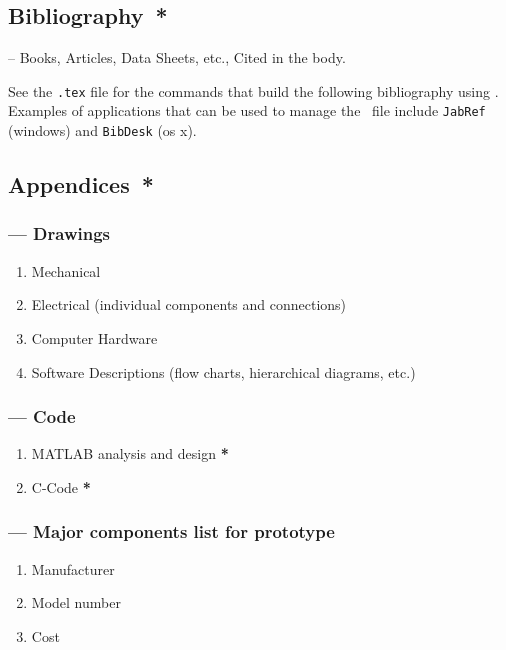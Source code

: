 \documentclass[twocolumn]{article}
\begin{document}
\subsection*{Bibliography{\color{red}\ *}}
-- Books, Articles, Data Sheets, etc., Cited in the body. 

See the \verb|.tex| file for the commands that build the following bibliography using \BibTeX. Examples of applications that can be used to manage the \BibTeX\  file include \verb|JabRef| (windows) and \verb|BibDesk| (os x).

\subsection*{Appendices{\color{red}\ *}}
\subsubsection*{ --- Drawings}
\begin{enumerate}
\item{Mechanical}
\item{Electrical (individual components and connections)}
\item{Computer Hardware}
\item{Software Descriptions (flow charts, hierarchical diagrams, etc.)}
\end{enumerate}

\subsubsection*{ --- Code}
\begin{enumerate}
\item{MATLAB analysis and design}   {\color{red}\bf{*}}
\item{C-Code} {\color{red}\bf{*}}
\end{enumerate}
\subsubsection*{ --- Major components list for prototype}
\begin{enumerate}
\item{Manufacturer}
\item{Model number}
\item{Cost}
\end{enumerate}
\end{document}
